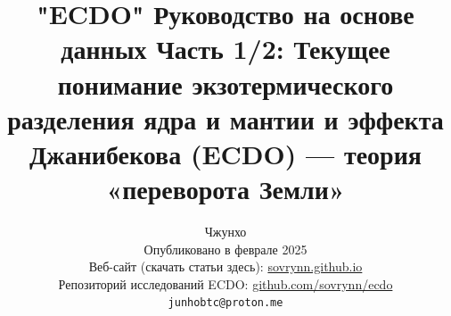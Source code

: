 \documentclass[10pt,twocolumn,letterpaper]{article}
\begin{document}
\title{"ECDO" Руководство на основе данных Часть 1/2: Текущее понимание экзотермического разделения ядра и мантии и эффекта Джанибекова (ECDO) — теория «переворота Земли»}

\author{Чжунхо\\
Опубликовано в феврале 2025\\
Веб-сайт (скачать статьи здесь): \href{https://sovrynn.github.io}{sovrynn.github.io}\\
Репозиторий исследований ECDO: \href{https://github.com/sovrynn/ecdo}{github.com/sovrynn/ecdo}\\
{\tt\small junhobtc@proton.me}
}

\maketitle
\end{document}
